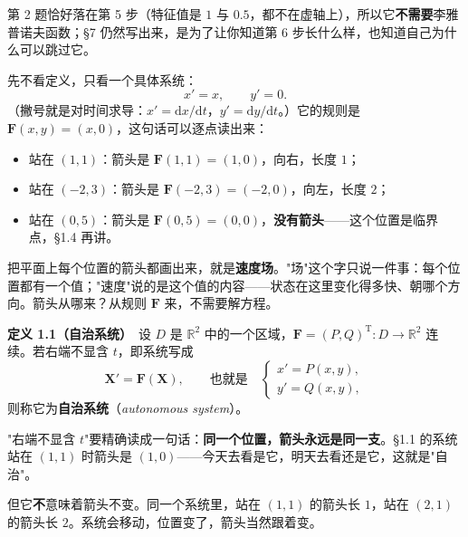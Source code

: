 \documentclass[11pt]{ctexart}
\newcommand{\X}{\mathbf{X}}\newcommand{\Y}{\mathbf{Y}}
\newcommand{\F}{\mathbf{F}}
\newcommand{\EN}[1]{\textcolor{inkgray}{\itshape #1}}
\begin{document}
第 2 题恰好落在第 5 步（特征值是 $1$ 与 $0.5$，都不在虚轴上），所以它\textbf{不需要}李雅普诺夫函数；§7 仍然写出来，是为了让你知道第 6 步长什么样，也知道自己为什么可以跳过它。



先不看定义，只看一个具体系统：
\[
x'=x,\qquad y'=0 .
\]
（撇号就是对时间求导：$x'=\mathrm{d}x/\mathrm{d}t$，$y'=\mathrm{d}y/\mathrm{d}t$。）它的规则是 $\F(x,y)=(x,0)$，这句话可以逐点读出来：

\begin{itemize}
\item 站在 $(1,1)$：箭头是 $\F(1,1)=(1,0)$，向右，长度 $1$；
\item 站在 $(-2,3)$：箭头是 $\F(-2,3)=(-2,0)$，向左，长度 $2$；
\item 站在 $(0,5)$：箭头是 $\F(0,5)=(0,0)$，\textbf{没有箭头}——这个位置是临界点，§1.4 再讲。
\end{itemize}

把平面上每个位置的箭头都画出来，就是\textbf{速度场}。"场"这个字只说一件事：每个位置都有一个值；"速度"说的是这个值的内容——状态在这里变化得多快、朝哪个方向。箭头从哪来？从规则 $\F$ 来，不需要解方程。


\textbf{定义 1.1（自治系统）}\ 设 $D$ 是 $\mathbb{R}^{2}$ 中的一个区域，$\F=(P,Q)^{\mathrm T}:D\to\mathbb{R}^{2}$ 连续。若右端不显含 $t$，即系统写成
\[
\X'=\F(\X),\qquad\text{也就是}\quad
\begin{cases}
x'=P(x,y),\\[2pt]
y'=Q(x,y),
\end{cases}
\tag{1.1}
\]
则称它为\textbf{自治系统}（\EN{autonomous system}）。

"右端不显含 $t$"要精确读成一句话：\textbf{同一个位置，箭头永远是同一支}。§1.1 的系统站在 $(1,1)$ 时箭头是 $(1,0)$——今天去看是它，明天去看还是它，这就是"自治"。

但它\textbf{不}意味着箭头不变。同一个系统里，站在 $(1,1)$ 的箭头长 $1$，站在 $(2,1)$ 的箭头长 $2$。系统会移动，位置变了，箭头当然跟着变。

\end{document}

